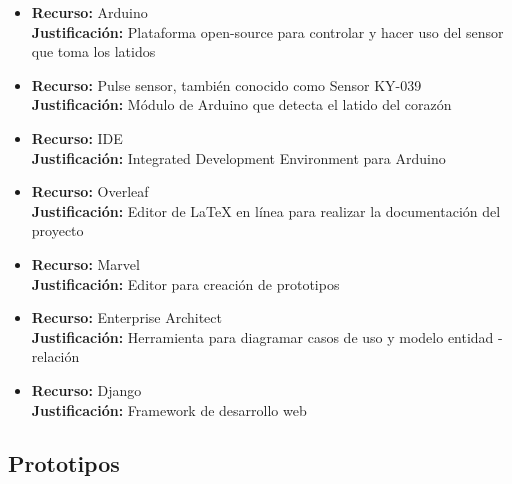 \documentclass[letterpaper, 10 pt, conference]{ieeeconf}  %
\begin{document}
\begin{itemize}

    \item 
        \textbf{Recurso:} Arduino\\
        \textbf{Justificaci\'on:} Plataforma open-source para controlar y hacer uso del sensor que toma los latidos\\
        
    \item 
        \textbf{Recurso:} Pulse sensor, tambi\'en conocido como Sensor KY-039\\
        \textbf{Justificaci\'on:} M\'odulo de Arduino que detecta el latido del coraz\'on\\
        
    \item 
        \textbf{Recurso:} IDE\\
        \textbf{Justificaci\'on:} Integrated Development Environment para Arduino\\
        
    \item 
        \textbf{Recurso:} Overleaf\\
        \textbf{Justificaci\'on:} Editor de LaTeX en l\'inea para realizar la documentaci\'on del proyecto\\
    
    \item 
        \textbf{Recurso:} Marvel\\
        \textbf{Justificaci\'on:} Editor para creaci\'on de prototipos\\
        
    \item 
        \textbf{Recurso:} Enterprise Architect\\
        \textbf{Justificaci\'on:} Herramienta para diagramar casos de uso y modelo entidad - relaci\'on\\
            
     \item 
        \textbf{Recurso:} Django\\
        \textbf{Justificaci\'on:} Framework de desarrollo web\\
        
\end{itemize}


\subsection{Prototipos}
\end{document}

